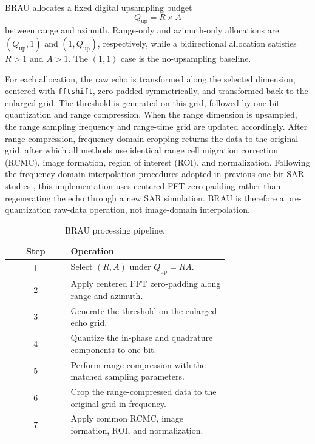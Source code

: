 \documentclass[conference]{IEEEtran}
\begin{document}
BRAU allocates a fixed digital upsampling budget
\begin{equation}
    Q_{\mathrm{up}}=R\times A
\end{equation}
between range and azimuth. Range-only and azimuth-only allocations are $(Q_{\mathrm{up}},1)$ and $(1,Q_{\mathrm{up}})$, respectively, while a bidirectional allocation satisfies $R>1$ and $A>1$. The $(1,1)$ case is the no-upsampling baseline.

For each allocation, the raw echo is transformed along the selected dimension, centered with \texttt{fftshift}, zero-padded symmetrically, and transformed back to the enlarged grid. The threshold is generated on this grid, followed by one-bit quantization and range compression. When the range dimension is upsampled, the range sampling frequency and range-time grid are updated accordingly. After range compression, frequency-domain cropping returns the data to the original grid, after which all methods use identical range cell migration correction (RCMC), image formation, region of interest (ROI), and normalization. Following the frequency-domain interpolation procedures adopted in previous one-bit SAR studies \cite{zhao2019onebit,nie2025fixed}, this implementation uses centered FFT zero-padding rather than regenerating the echo through a new SAR simulation. BRAU is therefore a pre-quantization raw-data operation, not image-domain interpolation.

\begin{table}[t]
\caption{BRAU processing pipeline.}
\label{tab:brau_pipeline}
\centering
\scriptsize
\setlength{\tabcolsep}{3pt}
\begin{tabular}{c p{0.72\linewidth}}
\hline
Step & Operation \\
\hline
1 & Select $(R,A)$ under $Q_{\mathrm{up}}=RA$. \\
2 & Apply centered FFT zero-padding along range and azimuth. \\
3 & Generate the threshold on the enlarged echo grid. \\
4 & Quantize the in-phase and quadrature components to one bit. \\
5 & Perform range compression with the matched sampling parameters. \\
6 & Crop the range-compressed data to the original grid in frequency. \\
7 & Apply common RCMC, image formation, ROI, and normalization. \\
\hline
\end{tabular}
\end{table}
\end{document}
